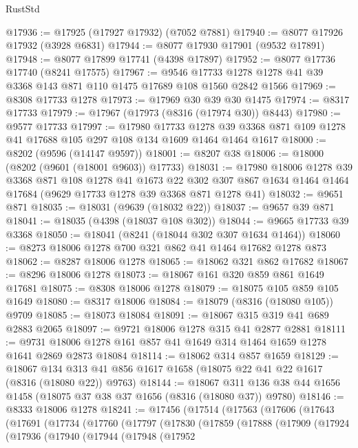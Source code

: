 \begin{lexlean}{RustStd}
\begin{coremodule}
@17936 := @17925 (@17927 @17932) (@7052 @7881)
@17940 := @8077 @17926 @17932 (@3928 @6831)
@17944 := @8077 @17930 @17901 (@9532 @17891)
@17948 := @8077 @17899 @17741 (@4398 @17897)
@17952 := @8077 @17736 @17740 (@8241 @17575)
@17967 := @9546 @17733 @1278 @1278 @41 @39 @3368 @143 @871 @110 @1475 @17689 @108 @1560 @2842 @1566
@17969 := @8308 @17733 @1278
@17973 := @17969 @30 @39 @30 @1475
@17974 := @8317 @17733
@17979 := @17967 (@17973 (@8316 (@17974 @30)) @8443)
@17980 := @9577 @17733
@17997 := @17980
    @17733
    @1278
    @39
    @3368
    @871
    @109
    @1278
    @41
    @17688
    @105
    @297
    @108
    @134
    @1609
    @1464
    @1464
    @1617
@18000 := @8202 (@9596 (@14147 @9597))
@18001 := @8207 @38
@18006 := @18000 (@8202 (@9601 (@18001 @9603)) @17733)
@18031 := @17980
    @18006
    @1278
    @39
    @3368
    @871
    @108
    @1278
    @41
    @1673
    @22
    @302
    @307
    @867
    @1634
    @1464
    @1464
    @17684
    (@9629 @17733 @1278 @39 @3368 @871 @1278 @41)
@18032 := @9651 @871
@18035 := @18031 (@9639 (@18032 @22))
@18037 := @9657 @39 @871
@18041 := @18035 (@4398 (@18037 @108 @302))
@18044 := @9665 @17733 @39 @3368
@18050 := @18041 (@8241 (@18044 @302 @307 @1634 @1464))
@18060 := @8273 @18006 @1278 @700 @321 @862 @41 @1464 @17682 @1278 @873
@18062 := @8287 @18006 @1278
@18065 := @18062 @321 @862 @17682
@18067 := @8296 @18006 @1278
@18073 := @18067 @161 @320 @859 @861 @1649 @17681
@18075 := @8308 @18006 @1278
@18079 := @18075 @105 @859 @105 @1649
@18080 := @8317 @18006
@18084 := @18079 (@8316 (@18080 @105)) @9709
@18085 := @18073 @18084
@18091 := @18067 @315 @319 @41 @689 @2883 @2065
@18097 := @9721 @18006 @1278 @315 @41 @2877 @2881
@18111 := @9731 @18006 @1278 @161 @857 @41 @1649 @314 @1464 @1659 @1278 @1641 @2869 @2873 @18084
@18114 := @18062 @314 @857 @1659
@18129 := @18067
    @134
    @313
    @41
    @856
    @1617
    @1658
    (@18075 @22 @41 @22 @1617 (@8316 (@18080 @22)) @9763)
@18144 := @18067 @311 @136 @38 @44 @1656 @1458 (@18075 @37 @38 @37 @1656 (@8316 (@18080 @37)) @9780)
@18146 := @8333 @18006 @1278
@18241 := @17456
    (@17514
      (@17563
        (@17606
          (@17643
            (@17691
              (@17734
                (@17760
                  (@17797
                    (@17830
                      (@17859
                        (@17888
                          (@17909
                            (@17924
                              (@17936
                                (@17940
                                  (@17944
                                    (@17948
                                      (@17952

\end{coremodule}
\end{lexlean}
